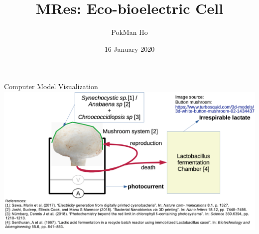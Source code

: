 \documentclass[xcolor=x11names,compress]{beamer}
\title{MRes: Eco-bioelectric Cell}
\author{PokMan Ho}
\date{16 January 2020}
\begin{document}
\begin{frame}
    \maketitle
\end{frame}

\begin{frame}{Computer Model Visualization}
    \includegraphics[width=\linewidth]{figure/proposed_model.png}
\end{frame}
\end{document}
